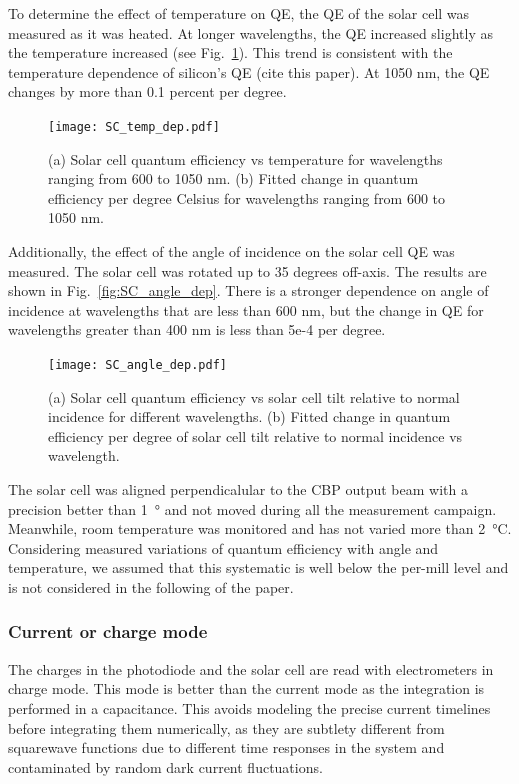 To determine the effect of temperature on QE, the QE of the solar cell was measured as it was heated. At longer wavelengths, the QE increased slightly as the temperature increased (see Fig.~\ref{fig:SC_temp}). This trend is consistent with the temperature dependence of silicon's QE (cite this paper). At 1050 nm, the QE changes by more than 0.1 percent per degree.
\begin{figure}[!h]
\centering
\texttt{[image: SC\_temp\_dep.pdf]}
\caption{(a) Solar cell quantum efficiency vs temperature for wavelengths ranging from 600 to 1050 nm. (b) Fitted change in quantum efficiency per degree Celsius for wavelengths ranging from 600 to 1050 nm.}
\label{fig:SC_temp}
\end{figure}
Additionally, the effect of the angle of incidence on the solar cell QE was measured. The solar cell was rotated up to 35 degrees off-axis. The results are shown in Fig.~\ref{fig:SC_angle_dep}. There is a stronger dependence on angle of incidence at wavelengths that are less than 600 nm, but the change in QE for wavelengths greater than 400 nm is less than 5e-4 per degree.
\begin{figure}[!h]
\centering
\texttt{[image: SC\_angle\_dep.pdf]}
\caption{(a) Solar cell quantum efficiency vs solar cell tilt relative to normal incidence for different wavelengths. (b) Fitted change in quantum efficiency per degree of solar cell tilt relative to normal incidence vs wavelength.}
\label{fig:SC_angle}
\end{figure}

The solar cell was aligned perpendicalular to the CBP output beam with a precision better than \SI{1}{\degree} and not moved during all the measurement campaign. Meanwhile, room temperature was monitored and has not varied more than \SI{2}{\degreeCelsius}. Considering measured variations of quantum efficiency with angle and temperature, we assumed that this systematic is well below the per-mill level and is not considered in the following of the paper. 



\subsubsection{Current or charge mode}

The charges in the photodiode and the solar cell are read with electrometers in charge mode. This mode is better than the current mode as the integration is performed in a capacitance. This avoids modeling the precise current timelines before integrating them numerically, as they are subtlety different from squarewave functions due to different time responses in the system and contaminated by random dark current fluctuations. 

